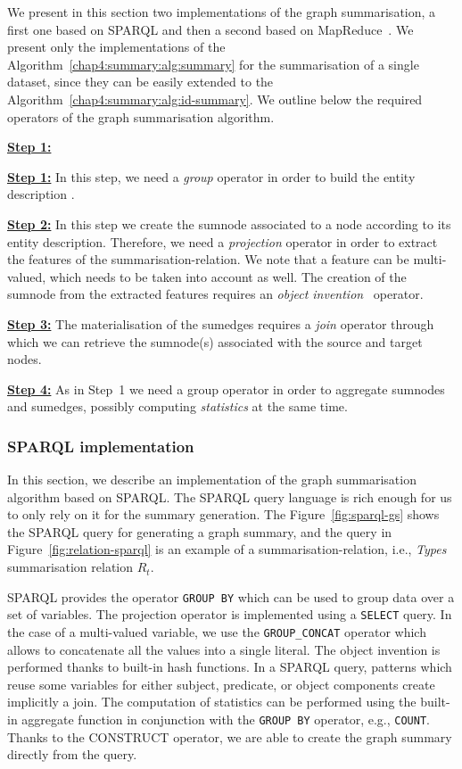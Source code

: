 We present in this section two implementations of the graph summarisation, a first one based on SPARQL and then a second based on MapReduce~\cite{dean:2004:msd}. We present only the implementations of the Algorithm~\ref{chap4:summary:alg:summary} for the summarisation of a single dataset, since they can be easily extended to the Algorithm~\ref{chap4:summary:alg:id-summary}. We outline below the required operators of the graph summarisation algorithm.
\begin{labeling}{\textbf{\underline{Step 1:}}}
\item[\textbf{\underline{Step 1:}}] In this step, we need a \emph{group} operator in order to build the entity description .
\item[\textbf{\underline{Step 2:}}] In this step we create the sumnode associated to a node according to its entity description. Therefore, we need a \emph{projection} operator in order to extract the features of the \gls{summarisation-relation}. We note that a feature can be multi-valued, which needs to be taken into account as well. The creation of the sumnode from the extracted features requires an \emph{object invention}~\cite{hull:1989:usi} operator.
\item[\textbf{\underline{Step 3:}}] The materialisation of the sumedges requires a \emph{join} operator through which we can retrieve the sumnode(s) associated with the source and target nodes.
\item[\textbf{\underline{Step 4:}}] As in Step~1 we need a group operator in order to aggregate sumnodes and sumedges, possibly computing \emph{statistics} at the same time.
\end{labeling}

\subsubsection{SPARQL implementation}

In this section, we describe an implementation of the graph summarisation algorithm based on SPARQL. The SPARQL query language is rich enough for us to only rely on it for the summary generation.
The Figure~\ref{fig:sparql-gs} shows the SPARQL query for generating a graph summary, and the query in Figure~\ref{fig:relation-sparql} is an example of a \gls{summarisation-relation}, i.e., \emph{Types} summarisation relation $R_t$.


SPARQL provides the operator \texttt{GROUP BY} which can be used to group data over a set of variables. The projection operator is implemented using a \texttt{SELECT} query. In the case of a multi-valued variable, we use the \texttt{GROUP\_CONCAT} operator which allows to concatenate all the values into a single literal. The object invention is performed thanks to built-in hash functions. In a SPARQL query, patterns which reuse some variables for either subject, predicate, or object components create implicitly a join. The computation of statistics can be performed using the built-in aggregate function in conjunction with the \texttt{GROUP BY} operator, e.g., \texttt{COUNT}. Thanks to the CONSTRUCT operator, we are able to create the graph summary directly from the query.

